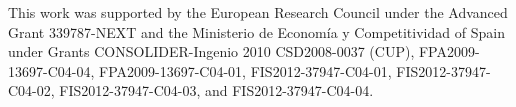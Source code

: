 \documentclass{JINST}
\begin{document}
\acknowledgments

This work was supported by the European Research Council under the Advanced Grant 339787-NEXT and the Ministerio de Econom\'{i}a y Competitividad of Spain under Grants CONSOLIDER-Ingenio 2010 CSD2008-0037 (CUP), FPA2009-13697-C04-04, FPA2009-13697-C04-01, FIS2012-37947-C04-01, FIS2012-37947-C04-02, FIS2012-37947-C04-03, and FIS2012-37947-C04-04.


\end{document}
